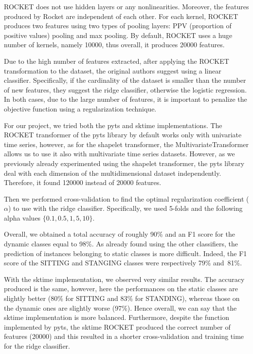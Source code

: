 \documentclass[10pt, a4paper, twocolumn]{article}
\begin{document}
ROCKET does not use hidden layers or any nonlinearities. Moreover, the features produced by Rocket are independent of each other. For each kernel, ROCKET produces two features using two types of pooling layers: PPV (proportion of positive values) pooling and max pooling. By default, ROCKET uses a huge number of kernels, namely \num{10000}, thus overall, it produces \num{20000} features. 

Due to the high number of features extracted, after applying the ROCKET transformation to the dataset, the original authors suggest using a linear classifier. Specifically, if the cardinality of the dataset is smaller than the number of new features, they suggest the ridge classifier, otherwise the logistic regression. In both cases, due to the large number of features, it is important to penalize the objective function using a regularization technique.

For our project, we tried both the pyts and sktime implementations. The ROCKET transformer of the pyts library by default works only with univariate time series, however, as for the shapelet transformer, the MultivariateTransformer allows us to use it also with multivariate time series datasets. However, as we previously already experimented using the shapelet transformer, the pyts library deal with each dimension of the multidimensional dataset independently. Therefore, it found \num{120000} instead of \num{20000} features.
 
Then we performed cross-validation to find the optimal regularization coefficient ($\alpha$) to use with the ridge classifier. Specifically, we used 5-folds and the following alpha values $\{0.1, 0.5, 1, 5, 10\}$. 

Overall, we obtained a total accuracy of roughly 90\% and an F1 score for the dynamic classes equal to 98\%. As already found using the other classifiers, the prediction of instances belonging to static classes is more difficult. Indeed, the F1 score of the SITTING and STANGING classes were respectively 79\% and~81\%. 

With the sktime implementation, we observed very similar results. The accuracy produced is the same, however, here the performances on the static classes are slightly better (80\% for SITTING and 83\% for STANDING), whereas those on the dynamic ones are slightly worse (97\%). Hence overall, we can say that the sktime implementation is more balanced. Furthermore, despite the function implemented by pyts, the sktime ROCKET produced the correct number of features (\num{20000}) and this resulted in a shorter cross-validation and training time for the ridge classifier. 
\end{document}
